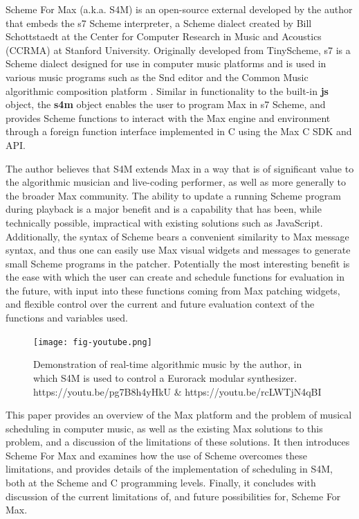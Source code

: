 \documentclass[acmsmall, anonymous, review]{acmart}
\begin{document}
Scheme For Max (a.k.a. S4M) is an open-source external developed by the 
author that embeds the s7 Scheme interpreter, a Scheme dialect created by
Bill Schottstaedt at the  Center for Computer Research in Music and Acoustics
(CCRMA) at Stanford University. Originally developed
from TinyScheme, s7 is a Scheme dialect designed for use in computer music
platforms and is used in various music programs such as the Snd editor and the
Common Music algorithmic composition platform \cite{Schottstaedt2021}.
Similar in functionality to the built-in \textbf{js} object, 
the \textbf{s4m} object enables the user to program Max in s7 Scheme,
and provides Scheme functions to interact with the Max engine and environment through
a foreign function interface implemented in C using the Max C SDK and API.

The author believes that S4M extends Max in a way that is of significant value to 
the algorithmic musician and live-coding performer, as well as more generally 
to the broader Max community. The ability to update
a running Scheme program during playback is a major benefit
and is a capability that has been, while technically possible, impractical
with existing solutions such as JavaScript. Additionally, the syntax
of Scheme bears a convenient similarity to Max message syntax, and thus 
one can easily use Max visual widgets and messages to generate small Scheme programs in the
patcher. Potentially the most interesting benefit is the ease with which the user 
can create and schedule functions for evaluation in the future, with 
input into these functions coming from Max patching widgets, and flexible control
over the current and future evaluation context of the functions and variables used.

\begin{figure}[H]
  \centering
  \texttt{[image: fig-youtube.png]}
  \caption{Demonstration of real-time algorithmic music by the author, in which S4M is used
  to control a Eurorack modular synthesizer. https://youtu.be/pg7B8h4yHkU \& https://youtu.be/rcLWTjN4qBI  }
\end{figure}


This paper provides an overview of the Max platform and the problem of musical scheduling
in computer music, as well as the existing Max solutions to this problem, 
and a discussion of the limitations of these solutions.
It then introduces Scheme For Max and examines how the use of Scheme
overcomes these limitations, and provides details of
the implementation of scheduling in S4M, both at the Scheme and
C programming levels. Finally, it concludes with discussion of 
the current limitations of, and future possibilities for, Scheme For Max. 
\end{document}
